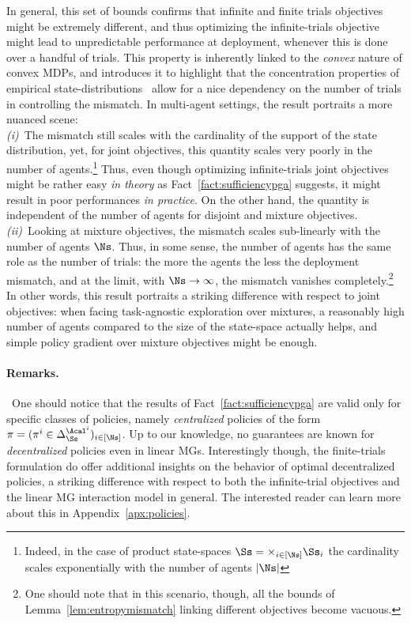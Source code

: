 In general, this set of bounds confirms that infinite and finite trials objectives might be extremely different, and thus optimizing the infinite-trials objective might lead to unpredictable performance at deployment, whenever this is done over a handful of trials. %
This property is inherently linked to the \emph{convex} nature of convex MDPs, and \citet{2023mutticonvexrlfinite} introduces it to highlight that the concentration properties of empirical state-distributions~\cite{Weissman2003InequalitiesFT} allow for a nice dependency on the number of trials in controlling the mismatch. In multi-agent settings, the result portraits a more nuanced scene:\\
\emph{(i)}~The mismatch still scales with the cardinality of the support of the state distribution, yet, for joint objectives, this quantity scales very poorly in the number of agents.\footnote{Indeed, in the case of product state-spaces $\Ss = \times_{i \in [\Ns]} \Ss_i$ the cardinality scales exponentially with the number of agents $|\Ns|$} Thus, even though optimizing infinite-trials joint objectives might be rather easy \emph{in theory} as Fact~\ref{fact:sufficiencypga} suggests, it might result in poor performances \emph{in practice}. On the other hand,  the quantity is independent of the number of agents for disjoint and mixture objectives.\\
\emph{(ii)}~Looking at mixture objectives, the mismatch scales sub-linearly with the number of agents $\Ns$. Thus, in some sense, the number of agents has the same role as the number of trials: the more the agents the less the deployment mismatch, and at the limit, with $\Ns \rightarrow \infty$, the mismatch vanishes completely.\footnote{One should note that in this scenario, though, all the bounds of Lemma~\ref{lem:entropymismatch} linking different objectives become vacuous.} In other words, this result portraits a striking difference with respect to joint objectives: when facing task-agnostic exploration over mixtures, a reasonably high number of agents compared to the size of the state-space actually helps, and simple policy gradient over mixture objectives might be enough. 
\vspace{-7pt}
\paragraph*{Remarks.}~One should notice that the results of Fact~\ref{fact:sufficiencypga} are valid only for specific classes of policies, namely \emph{centralized} policies of the form $\pi = (\pi^i\in \Delta_\Ss^{\Acal^i})_{i \in [\Ns]}$. Up to our knowledge, no guarantees are known for \emph{decentralized} policies even in linear MGs. Interestingly though, the finite-trials formulation do offer additional insights on the behavior of optimal decentralized policies, a striking difference with respect to both the infinite-trial objectives and the linear MG interaction model in general. The interested reader can learn more about this in Appendix~\ref{apx:policies}.